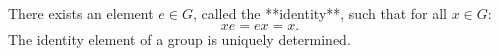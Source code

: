 There exists an element $e \in G$, called the **identity**, such that for all $x \in G$:
$$xe = ex = x.$$
The identity element of a group is uniquely determined.
